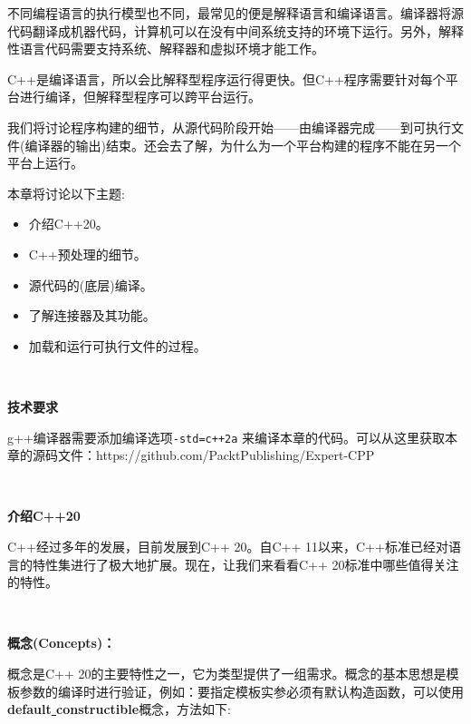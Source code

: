 不同编程语言的执行模型也不同，最常见的便是解释语言和编译语言。编译器将源代码翻译成机器代码，计算机可以在没有中间系统支持的环境下运行。另外，解释性语言代码需要支持系统、解释器和虚拟环境才能工作。 \par
C++是编译语言，所以会比解释型程序运行得更快。但C++程序需要针对每个平台进行编译，但解释型程序可以跨平台运行。 \par
我们将讨论程序构建的细节，从源代码阶段开始——由编译器完成——到可执行文件(编译器的输出)结束。还会去了解，为什么为一个平台构建的程序不能在另一个平台上运行。 \par
本章将讨论以下主题: \par

\begin{itemize}
	\item 介绍C++20。
	\item C++预处理的细节。
	\item 源代码的(底层)编译。
	\item 了解连接器及其功能。
	\item 加载和运行可执行文件的过程。
\end{itemize}

\noindent\textbf{}\ \par
\textbf{技术要求} \ \par
g++编译器需要添加编译选项\texttt{-std=c++2a} 来编译本章的代码。可以从这里获取本章的源码文件：https:/​/github.​com/PacktPublishing/Expert-CPP \par

\noindent\textbf{}\ \par
\textbf{介绍C++20} \ \par
C++经过多年的发展，目前发展到C++ 20。自C++ 11以来，C++标准已经对语言的特性集进行了极大地扩展。现在，让我们来看看C++ 20标准中哪些值得关注的特性。 \par

\noindent\textbf{}\ \par
\textbf{概念(Concepts)：}\ \par
概念是C++ 20的主要特性之一，它为类型提供了一组需求。概念的基本思想是模板参数的编译时进行验证，例如：要指定模板实参必须有默认构造函数，可以使用\textbf{default\underline{ }constructible}概念，方法如下: \par
\noindent\textbf{}\ \par

	
